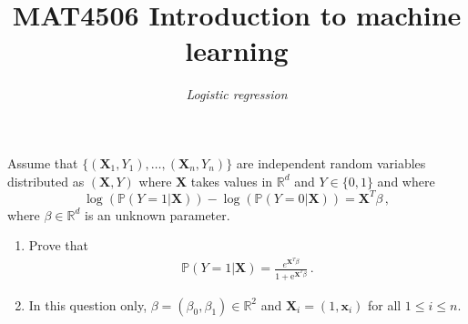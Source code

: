 \documentclass[a4paper,10pt,fleqn]{article}
\title{{\bf MAT4506 Introduction to machine learning}}
\author{{\em Logistic regression}}
\date{}
\newcommand{\rset}{\ensuremath{\mathbb{R}}}
\newcommand{\1}{\ensuremath{\mathbbm{1}}}
\newcommand{\bX}{\mathbf{X}}
\newcommand{\bx}{\mathbf{x}}
\begin{document}
\maketitle

Assume that $\{(\bX_1, Y_1), \hdots, (\bX_n, Y_n)\}$ are independent random variables distributed as $(\bX, Y)$ where $\bX$ takes values in $\mathbb{R}^d$ and $Y \in  \{ 0, 1 \}$ and where
$$
\log \left(\mathbb{P}\left(Y=1 | \bX\right)\right) - \log \left(\mathbb{P}\left(Y=0 | \bX\right)\right) = \bX^T \beta \, ,
$$
where $\beta\in\rset^d$ is an unknown parameter.



\begin{enumerate}
	
	\item Prove that 
	\begin{align*}
	\mathbb{P}\left(Y=1 | \bX\right) = \frac{e^{\bX^T \beta}}{1 + \mathrm{e}^{\bX^T \beta}}\,.
	\end{align*}
	\item In this question only,  $\beta = (\beta_0,\beta_1)\in \rset^2$ and $\bX_i = (1,\bx_i)$ for all $1\leqslant i \leqslant n$.


\end{enumerate}
\end{document}
